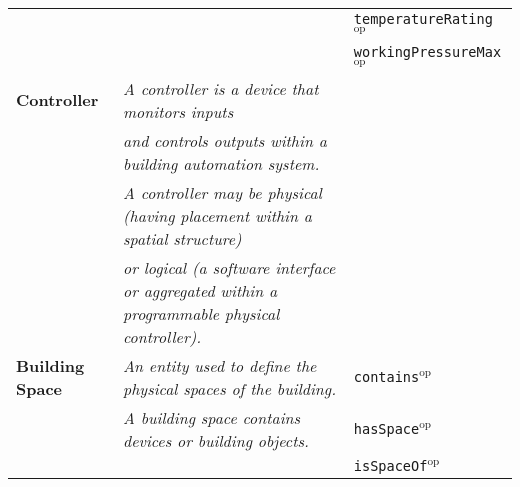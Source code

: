 {\begin{tabular}{lll}
                                  &                                                                                                        & \texttt{temperatureRating}$^\textrm{op}$         \\
                                  &                                                                                                        & \texttt{workingPressureMax}$^\textrm{op}$        \\ \midrule
\textbf{Controller}               & \textit{A controller is a device that monitors inputs}                                                          &                             \\
                                  & \textit{and controls outputs within a building automation system.}                                              &                             \\
                                  & \textit{A controller may be physical (having placement within a spatial structure)}                             &                             \\
                                  & \textit{or logical (a software interface or aggregated within a programmable physical controller).}             &                             \\ \midrule
\textbf{Building Space}           & \textit{An entity used to define the physical spaces of the building.}                                          &  \texttt{contains}$^\textrm{op}$      \\
                                  & \textit{A building space contains devices or building objects.}                                                 &  \texttt{hasSpace}$^\textrm{op}$      \\
                                  &                                                                                                                 &  \texttt{isSpaceOf}$^\textrm{op}$      \\
\bottomrule

\end{tabular}
}


